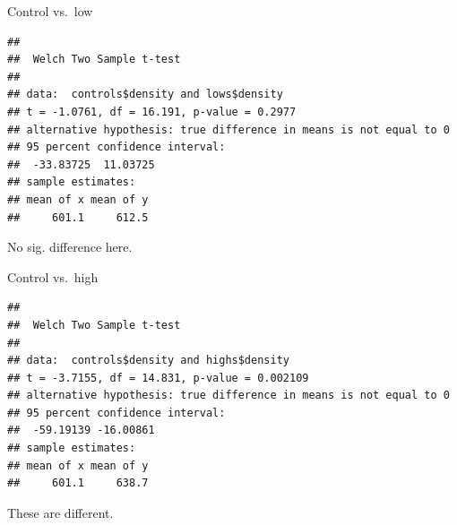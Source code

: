 \documentclass[ignorenonframetext,]{beamer}
\newenvironment{Shaded}{\begin{snugshade}}{\end{snugshade}}
\newcommand{\KeywordTok}[1]{\textcolor[rgb]{0.13,0.29,0.53}{\textbf{#1}}}
\newcommand{\NormalTok}[1]{#1}
\newcommand{\OperatorTok}[1]{\textcolor[rgb]{0.81,0.36,0.00}{\textbf{#1}}}
\begin{document}
\begin{frame}[fragile]{Control vs.~low}
\protect\hypertarget{control-vs.low}{}

\begin{Shaded}
\end{Shaded}

\begin{verbatim}
## 
##  Welch Two Sample t-test
## 
## data:  controls$density and lows$density
## t = -1.0761, df = 16.191, p-value = 0.2977
## alternative hypothesis: true difference in means is not equal to 0
## 95 percent confidence interval:
##  -33.83725  11.03725
## sample estimates:
## mean of x mean of y 
##     601.1     612.5
\end{verbatim}

No sig. difference here.

\end{frame}

\begin{frame}[fragile]{Control vs.~high}
\protect\hypertarget{control-vs.high}{}

\begin{Shaded}
\end{Shaded}

\begin{verbatim}
## 
##  Welch Two Sample t-test
## 
## data:  controls$density and highs$density
## t = -3.7155, df = 14.831, p-value = 0.002109
## alternative hypothesis: true difference in means is not equal to 0
## 95 percent confidence interval:
##  -59.19139 -16.00861
## sample estimates:
## mean of x mean of y 
##     601.1     638.7
\end{verbatim}

These are different.

\end{frame}
\end{document}
